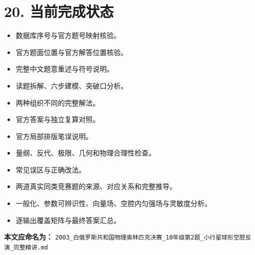 \documentclass[
  11pt,
  UTF8]{ctexart}
\providecommand{\tightlist}{%
  \setlength{\itemsep}{0pt}\setlength{\parskip}{0pt}}
\begin{document}
\hypertarget{ux5f53ux524dux5b8cux6210ux72b6ux6001}{%
\section{20. 当前完成状态}\label{ux5f53ux524dux5b8cux6210ux72b6ux6001}}

\begin{itemize}
\tightlist
\item[$\boxtimes$]
  数据库序号与官方题号映射核验。
\item[$\boxtimes$]
  官方题面位置与官方解答位置核验。
\item[$\boxtimes$]
  完整中文题意重述与符号说明。
\item[$\boxtimes$]
  读题拆解、六步建模、突破口分析。
\item[$\boxtimes$]
  两种组织不同的完整解法。
\item[$\boxtimes$]
  官方答案与独立复算对照。
\item[$\boxtimes$]
  官方局部排版笔误说明。
\item[$\boxtimes$]
  量纲、反代、极限、几何和物理合理性检查。
\item[$\boxtimes$]
  常见误区与正确改法。
\item[$\boxtimes$]
  两道真实同类竞赛题的来源、对应关系和完整推导。
\item[$\boxtimes$]
  一般化、参数可辨识性、向量场、空腔内匀强场与灵敏度分析。
\item[$\boxtimes$]
  逐输出覆盖矩阵与最终答案汇总。
\end{itemize}

\textbf{本文应命名为：}
\texttt{2003\_白俄罗斯共和国物理奥林匹克决赛\_10年级第2题\_小行星球形空腔反演\_完整精讲.md}
\end{document}
